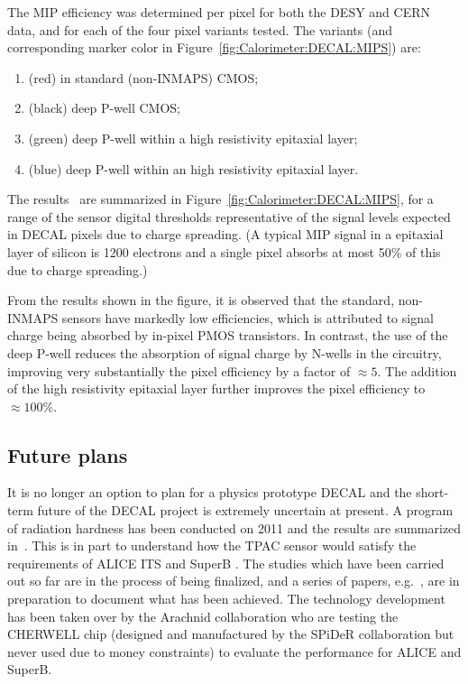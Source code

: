 The MIP efficiency was determined per pixel for both the DESY and CERN data, and for each of the four pixel variants tested. The variants (and corresponding marker color in Figure~\ref{fig:Calorimeter:DECAL:MIPS}) are:

\begin{enumerate}
\item (red) in \unit[12]{\micron} standard (non-INMAPS) CMOS;
\item (black) \unit[12]{\micron} deep P-well CMOS;
\item (green) deep P-well within a \unit[12]{\micron} high resistivity epitaxial layer;
\item (blue) deep P-well within an \unit[18]{\micron} high resistivity epitaxial layer.
\end{enumerate}

The results~\cite{Dauncey:2010zz} are summarized in Figure~\ref{fig:Calorimeter:DECAL:MIPS}, for a range of the sensor digital thresholds representative of the signal levels expected in DECAL pixels due to charge spreading. (A typical MIP signal in a \unit[12]{\micron} epitaxial layer of silicon is 1200 electrons and a single pixel absorbs at most 50\% of this due to charge spreading.)

From the results shown in the figure, it is observed that the standard, non-INMAPS sensors have markedly low efficiencies, which is attributed to signal charge being absorbed by in-pixel PMOS transistors. In contrast, the use of the deep P-well reduces the absorption of signal charge by N-wells in the circuitry, improving very substantially the pixel efficiency by a factor of $\approx 5$. The addition of the high resistivity epitaxial layer further improves the pixel efficiency to $\approx 100\%$.

\subsection{Future plans}
It is no longer an option to plan for a physics prototype DECAL and the short-term future of the DECAL project is extremely uncertain at present. A program of radiation hardness has been conducted on 2011 and the results are summarized in~\cite{Price:2012vta,Price:2013js}. This is in part to understand how the TPAC sensor would satisfy the requirements of ALICE ITS and SuperB . The studies which have been carried out so far are in the process of being finalized, and a series of papers, e.g.~\cite{Ballin:2011jq}, are in preparation to document what has been achieved. The technology development has been taken over by the Arachnid collaboration who are testing the CHERWELL chip (designed and manufactured by the SPiDeR collaboration but never used due to money constraints) to evaluate the performance for ALICE and SuperB.
